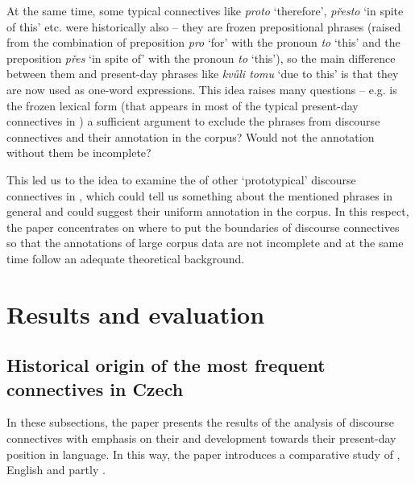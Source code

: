 \documentclass[output=paper]{langsci/langscibook.cls}
\begin{document}
At the same time, some typical  connectives like\textit{ proto} `therefore', \textit{přesto }`in spite of this' etc. were historically also  – they are frozen prepositional phrases (raised from the combination of preposition \textit{pro} `for' with the pronoun \textit{to} `this' and the preposition \textit{přes} `in spite of' with the pronoun \textit{to} `this'), so the main difference between them and present-day phrases like \textit{kvůli tomu} `due to this' is that they are now used as one-word expressions. This idea raises many questions – e.g. is the frozen lexical form (that appears in most of the typical present-day connectives in ) a sufficient argument to exclude the  phrases from discourse connectives and their annotation in the corpus? Would not the annotation without them be incomplete? 

\largerpage
This led us to the idea to examine the  of other `prototypical' discourse connectives in , which could tell us something about the mentioned  phrases in general and could suggest their uniform annotation in the corpus. In this respect, the paper concentrates on where to put the boundaries of discourse connectives so that the annotations of large corpus data are not incomplete and at the same time follow an adequate theoretical background.


\section{Results and evaluation}

\subsection{Historical origin of the most frequent connectives in Czech}

In these subsections, the paper presents the results of the analysis of discourse connectives with emphasis on their  and development towards their present-day position in language. In this way, the paper introduces a comparative study of , English and partly .
\end{document}
